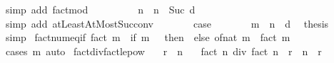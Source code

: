 \begin{isabellebody}
\ {\isacharparenleft}{\kern0pt}simp\ add{\isacharcolon}{\kern0pt}\ fact{\isacharunderscore}{\kern0pt}mod{\isacharparenright}{\kern0pt}\isanewline
\ \ \ \ \isamarkupfalse%
\ \isamarkupfalse%
\ {\isachardoublequoteopen}{\isasymdots}\ {\isacharequal}{\kern0pt}\ {\isasymProd}{\isacharbraceleft}{\kern0pt}n\ {\isacharplus}{\kern0pt}\ {}{\isachardot}{\kern0pt}{\isachardot}{\kern0pt}n\ {\isacharplus}{\kern0pt}\ Suc\ d{\isacharprime}{\kern0pt}{\isacharbraceright}{\kern0pt}{\isachardoublequoteclose}\isanewline
\ \ \ \ \ \ \isamarkupfalse%
\ {\isacharparenleft}{\kern0pt}simp\ add{\isacharcolon}{\kern0pt}\ atLeastAtMostSuc{\isacharunderscore}{\kern0pt}conv{\isacharparenright}{\kern0pt}\isanewline
\ \ \ \ \isamarkupfalse%
\ \isamarkupfalse%
\ {\isacharquery}{\kern0pt}case\ \isacommand{{\isachardot}{\kern0pt}}\isamarkupfalse%
\isanewline
\ \ \isamarkupfalse%
\isanewline
\ \ \isamarkupfalse%
\ {\isacartoucheopen}m\ {\isacharequal}{\kern0pt}\ n\ {\isacharplus}{\kern0pt}\ d{\isacartoucheclose}\ \isamarkupfalse%
\ {\isacharquery}{\kern0pt}thesis\ \isamarkupfalse%
\ simp\isanewline
{}\isamarkupfalse%
%
\endisatagproof
{\isafoldproof}%
%
\isadelimproof
\isanewline
%
\endisadelimproof
\isanewline
{}\isamarkupfalse%
\ fact{\isacharunderscore}{\kern0pt}num{\isacharunderscore}{\kern0pt}eq{\isacharunderscore}{\kern0pt}if{\isacharcolon}{\kern0pt}\ {\isachardoublequoteopen}fact\ m\ {\isacharequal}{\kern0pt}\ {\isacharparenleft}{\kern0pt}if\ m\ {\isacharequal}{\kern0pt}\ {}\ then\ {}\ else\ of{\isacharunderscore}{\kern0pt}nat\ m\ {\isacharasterisk}{\kern0pt}\ fact\ {\isacharparenleft}{\kern0pt}m\ {\isacharminus}{\kern0pt}\ {}{\isacharparenright}{\kern0pt}{\isacharparenright}{\kern0pt}{\isachardoublequoteclose}\isanewline
%
\isadelimproof
\ \ %
\endisadelimproof
%
\isatagproof
{}\isamarkupfalse%
\ {\isacharparenleft}{\kern0pt}cases\ m{\isacharparenright}{\kern0pt}\ auto%
\endisatagproof
{\isafoldproof}%
%
\isadelimproof
\isanewline
%
\endisadelimproof
\isanewline
{}\isamarkupfalse%
\ fact{\isacharunderscore}{\kern0pt}div{\isacharunderscore}{\kern0pt}fact{\isacharunderscore}{\kern0pt}le{\isacharunderscore}{\kern0pt}pow{\isacharcolon}{\kern0pt}\isanewline
\ \ \ {\isachardoublequoteopen}r\ {\isasymle}\ n{\isachardoublequoteclose}\isanewline
\ \ \ {\isachardoublequoteopen}fact\ n\ div\ fact\ {\isacharparenleft}{\kern0pt}n\ {\isacharminus}{\kern0pt}\ r{\isacharparenright}{\kern0pt}\ {\isasymle}\ n\ {\isacharcircum}{\kern0pt}\ r{\isachardoublequoteclose}\isanewline

\end{isabellebody}
